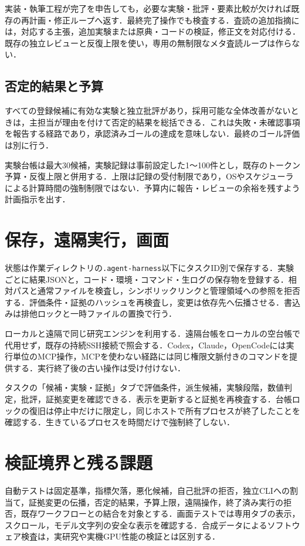 \documentclass[submit,techrep,noauthor]{ipsj}
\begin{document}
実装・執筆工程が完了を申告しても，必要な実験・批評・要素比較が欠ければ既存の再計画・修正ループへ返す．最終完了操作でも検査する．査読の追加指摘には，対応する主張，追加実験または原典・コードの検証，修正文を対応付ける．既存の独立レビューと反復上限を使い，専用の無制限なメタ査読ループは作らない．

\subsection{否定的結果と予算}
すべての登録候補に有効な実験と独立批評があり，採用可能な全体改善がないときは，主担当が理由を付けて否定的結果を総括できる．これは失敗・未確認事項を報告する経路であり，承認済みゴールの達成を意味しない．最終のゴール評価は別に行う．

実験台帳は最大30候補，実験記録は事前設定した1〜100件とし，既存のトークン予算・反復上限と併用する．上限は記録の受付制限であり，OSやスケジューラによる計算時間の強制制限ではない．予算内に報告・レビューの余裕を残すよう計画指示を出す．

\section{保存，遠隔実行，画面}
状態は作業ディレクトリの\texttt{.agent-harness}以下にタスクID別で保存する．実験ごとに結果JSONと，コード・環境・コマンド・生ログの保存物を登録する．相対パスと通常ファイルを検査し，シンボリックリンクと管理領域への参照を拒否する．評価条件・証拠のハッシュを再検査し，変更は依存先へ伝播させる．書込みは排他ロックと一時ファイルの置換で行う．

ローカルと遠隔で同じ研究エンジンを利用する．遠隔台帳をローカルの空台帳で代用せず，既存の持続SSH接続で照会する．Codex，Claude，OpenCodeには実行単位のMCP操作，MCPを使わない経路には同じ権限文脈付きのコマンドを提供する．実行終了後の古い操作は受け付けない．

タスクの「候補・実験・証拠」タブで評価条件，派生候補，実験段階，数値判定，批評，証拠変更を確認できる．表示を更新すると証拠を再検査する．台帳ロックの復旧は停止中だけに限定し，同じホストで所有プロセスが終了したことを確認する．生きているプロセスを時間だけで強制終了しない．

\section{検証境界と残る課題}
自動テストは固定基準，指標欠落，悪化候補，自己批評の拒否，独立CLIへの割当て，証拠変更の伝播，否定的結果，予算上限，遠隔操作，終了済み実行の拒否，既存ワークフローとの結合を対象とする．画面テストでは専用タブの表示，スクロール，モデル文字列の安全な表示を確認する．合成データによるソフトウェア検査は，実研究や実機GPU性能の検証とは区別する．
\end{document}
